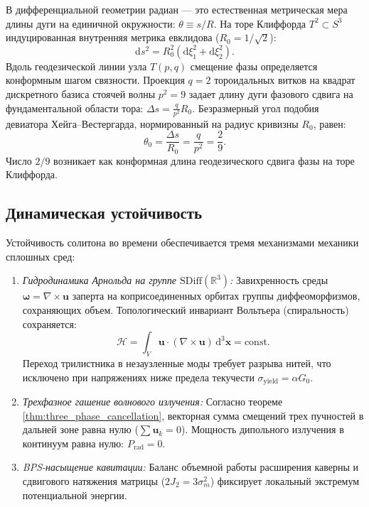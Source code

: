 \documentclass[11pt,a4paper]{article}
\theoremstyle{definition}
\theoremstyle{remark}
\begin{document}
В дифференциальной геометрии радиан — это естественная метрическая мера длины дуги на единичной окружности: $\theta \equiv s / R$. На торе Клиффорда $T^2 \subset S^3$ индуцированная внутренняя метрика евклидова ($R_0 = 1/\sqrt{2}$):
\begin{equation}
	\mathrm{d}s^2 = R_0^2 (\mathrm{d}\xi_1^2 + \mathrm{d}\xi_2^2).
\end{equation}
Вдоль геодезической линии узла $T(p,q)$ смещение фазы определяется конформным шагом связности. Проекция $q=2$ тороидальных витков на квадрат дискретного базиса стоячей волны $p^2 = 9$ задает длину дуги фазового сдвига на фундаментальной области тора: $\Delta s = \frac{q}{p^2} R_0$. Безразмерный угол подобия девиатора Хейга--Вестергарда, нормированный на радиус кривизны $R_0$, равен:
\begin{equation}
	\theta_0 = \frac{\Delta s}{R_0} = \frac{q}{p^2} = \frac{2}{9}.
\end{equation}
Число $2/9$ возникает как конформная длина геодезического сдвига фазы на торе Клиффорда.

\subsection{Динамическая устойчивость}

Устойчивость солитона во времени обеспечивается тремя механизмами механики сплошных сред:
\begin{enumerate}
\item \textit{Гидродинамика Арнольда на группе $\mathrm{SDiff}(\mathbb{R}^3)$:} Завихренность среды $\boldsymbol{\omega} = \nabla \times \mathbf{u}$ заперта на коприсоединенных орбитах группы диффеоморфизмов, сохраняющих объем. Топологический инвариант Вольтьера (спиральность) сохраняется:
\begin{equation}
\mathcal{H} = \int_V \mathbf{u} \cdot (\nabla \times \mathbf{u}) \, \mathrm{d}^3\mathbf{x} = \text{const}.
\end{equation}
	Переход трилистника в незаузленные моды требует разрыва нитей, что исключено при напряжениях ниже предела текучести $\sigma_{\mathrm{yield}} = \alpha G_0$.
\item \textit{Трехфазное гашение волнового излучения:} Согласно теореме \ref{thm:three_phase_cancellation}, векторная сумма смещений трех пучностей в дальней зоне равна нулю ($\sum \mathbf{u}_k = 0$). Мощность дипольного излучения в континуум равна нулю: $P_{\mathrm{rad}} = 0$.
\item \textit{BPS-насыщение кавитации:} Баланс объемной работы расширения каверны и сдвигового натяжения матрицы ($2J_2 = 3\sigma_m^2$) фиксирует локальный экстремум потенциальной энергии.
\end{enumerate}
\end{document}
